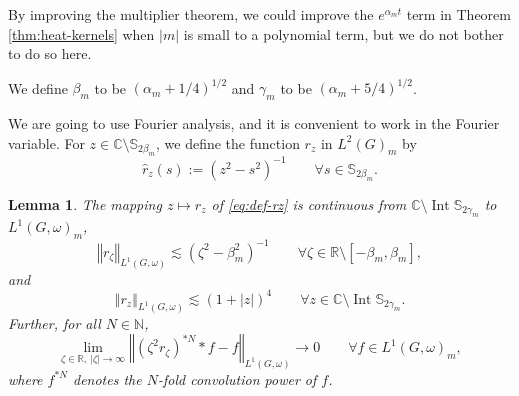 \documentclass[12pt,a4paper]{amsart}
\newtheorem{lem}[thm]{Lemma}
\theoremstyle{definition}
\theoremstyle{remark}
\numberwithin{equation}{section}
\newcommand{\norm}[1]{\left\Vert#1\right\Vert}
\newcommand{\Int}{\operatorname{Int}}
\newcommand{\R}{\mathbb{R}}
\newcommand{\C}{\mathbb{C}}
\newcommand{\N}{\mathbb{N}}
\newcommand{\Strip}{\mathbb{S}}
\newcommand{\var}{s}
\begin{document}
By improving the multiplier theorem, we could improve the $e^{\alpha_m t}$ term in Theorem \ref{thm:heat-kernels} when $|m| $ is small to a polynomial term, but we do not bother to do so here.

We define $\beta_m$ to be $( \alpha_m + 1/4)^{1/2}$ and $\gamma_m$ to be $( \alpha_m + 5/4)^{1/2}$.

We are going to use Fourier analysis, and it is convenient to work in the Fourier variable.
For $z \in \C\setminus \Strip_{2 \beta_m}$, we define the function $r_z$ in $L^2(G)_m$ by 
\begin{equation}\label{eq:def-rz}
\hat r_z(\var) := (z^2  - \var^2)^{-1}
\qquad\forall s \in \Strip_{2\beta_m} .
\end{equation}


\begin{lem}\label{lem:resolvents}
The mapping $z \mapsto r_z$ of \eqref{eq:def-rz} is continuous from $\C \setminus \Int \Strip_{2\gamma_m}$  to $L^1(G,\omega)_m$, 
\begin{equation}\label{eq:real-z-estimate}
\norm{ r_\zeta }_{L^1(G,\omega)} \lesssim (\zeta^2  - \beta_m^2)^{-1} 
\qquad\forall \zeta \in \R \setminus [-\beta_m,\beta_m],
\end{equation}
and
\begin{equation}\label{eq:all-z-estimate}
\norm{ r_z }_{L^1(G,\omega)} \lesssim (1 + |z|)^4         
\qquad\forall z \in \C \setminus \Int \Strip_{2\gamma_m}.
\end{equation}
Further, for all $N \in \N$, 
\[
\lim_{\zeta \in \R,\ |\zeta| \to \infty} \norm{ (\zeta^2 r_\zeta)^{*N} * f - f }_{L^1(G,\omega)} \to 0
\qquad\forall f \in L^1(G,\omega)_m ,
\]
where $f^{*N}$ denotes the $N$-fold convolution power of $f$.
\end{lem}
\end{document}
